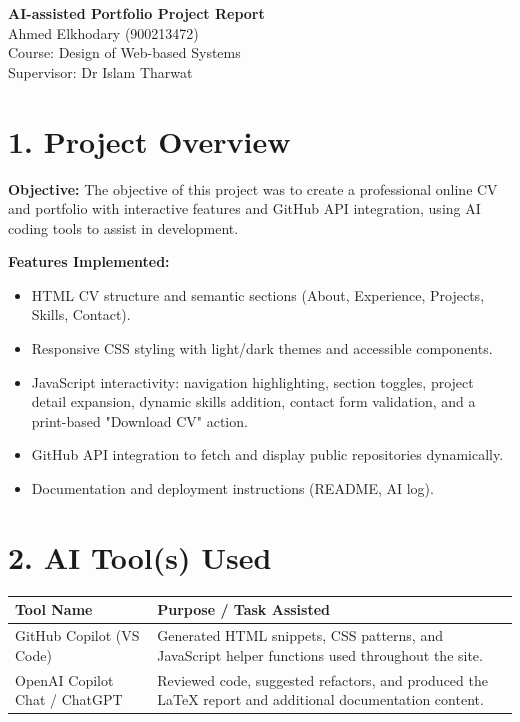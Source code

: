 \documentclass[11pt,a4paper]{article}
\begin{document}
\begin{center}
{\LARGE \textbf{AI-assisted Portfolio Project Report}}\\[0.5em]
{\large Ahmed Elkhodary (900213472)}\\
Course: Design of Web-based Systems \\ 
Supervisor: Dr Islam Tharwat \\
\end{center}

\section*{1. Project Overview}
\textbf{Objective:} The objective of this project was to create a professional online CV and portfolio with interactive features and GitHub API integration, using AI coding tools to assist in development.

\textbf{Features Implemented:}
\begin{itemize}
  \item HTML CV structure and semantic sections (About, Experience, Projects, Skills, Contact).
  \item Responsive CSS styling with light/dark themes and accessible components.
  \item JavaScript interactivity: navigation highlighting, section toggles, project detail expansion, dynamic skills addition, contact form validation, and a print-based "Download CV" action.
  \item GitHub API integration to fetch and display public repositories dynamically.
  \item Documentation and deployment instructions (README, AI log).
\end{itemize}

\section*{2. AI Tool(s) Used}
\begin{tabularx}{\textwidth}{@{}lX@{}}
\toprule
Tool Name & Purpose / Task Assisted \\
\midrule
GitHub Copilot (VS Code) & Generated HTML snippets, CSS patterns, and JavaScript helper functions used throughout the site. \\
OpenAI Copilot Chat / ChatGPT & Reviewed code, suggested refactors, and produced the LaTeX report and additional documentation content. \\
\bottomrule
\end{tabularx}
\end{document}
